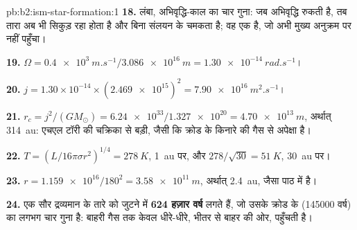 \begin{solution}{pb:b2:ism-star-formation:1}
\textbf{18.} लंबा, अभिवृद्धि-काल का चार गुना: जब अभिवृद्धि रुकती है, तब तारा
अब भी सिकुड़ रहा होता है और बिना संलयन के चमकता है; वह एक  है, जो अभी मुख्य
अनुक्रम पर नहीं पहुँचा।

\textbf{19.} $\Omega = \qty{0.4e3}{m.s^{-1}}/\qty{3.086e16}{m} = \qty{1.30e-14}{rad.s^{-1}}$।

\textbf{20.} $j = 1.30\times10^{-14}\times(\num{2.469e15})^2 = \qty{7.90e16}{m^2.s^{-1}}$।

\textbf{21.} $r_c = j^2/(GM_\odot) = \num{6.24e33}/\num{1.327e20} = \qty{4.70e13}{m}$,
अर्थात् \qty{314}{au}: एचएल टॉरी की चक्रिका से बड़ी, जैसी कि क्रोड के किनारे की गैस से
अपेक्षा है।

\textbf{22.} $T = (L/16\pi\sigma r^2)^{1/4} = \qty{278}{K}$, \qty{1}{au} पर, और
$278/\sqrt{30} = \qty{51}{K}$, \qty{30}{au} पर।

\textbf{23.} $r = \num{1.159e16}/180^2 = \qty{3.58e11}{m}$, अर्थात् \qty{2.4}{au}, जैसा पाठ में है।

\textbf{24.} एक सौर द्रव्यमान के तारे को जुटने में
\textbf{\qty[text-series-to-math=true]{624}{} हज़ार वर्ष} लगते हैं, जो उसके क्रोड के
 (\num{145000} वर्ष) का लगभग चार गुना है: बाहरी गैस
 तक केवल धीरे-धीरे, भीतर से बाहर की ओर, पहुँचती है।
\end{solution}
